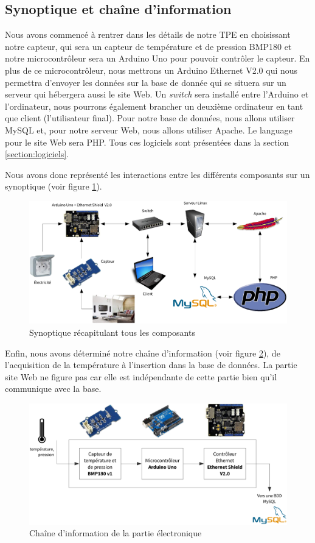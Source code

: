 \subsection{Synoptique et chaîne d'information}

Nous avons commencé à rentrer dans les détails de notre TPE en choisissant notre capteur, qui sera un capteur de température et de pression BMP180 et notre microcontrôleur sera un Arduino Uno pour pouvoir contrôler le capteur. En plus de ce microcontrôleur, nous mettrons un Arduino Ethernet V2.0 qui nous permettra d'envoyer les données sur la base de donnée qui se situera sur un serveur qui hébergera aussi le site Web. Un \emph{switch} sera installé entre l'Arduino et l'ordinateur, nous pourrons également brancher un deuxième ordinateur en tant que client (l'utilisateur final). Pour notre base de données, nous allons utiliser MySQL et, pour notre serveur Web, nous allons utiliser Apache. Le language pour le site Web sera PHP. Tous ces logiciels sont présentées dans la section \ref{section:logiciels}.

Nous avons donc représenté les interactions entre les différents composants sur un synoptique (voir figure \ref{figure:synoptique}).

\begin{figure}[!h]
	\centering
	\includegraphics[width=.9\linewidth]{Images/Synoptique}
	\caption{Synoptique récapitulant tous les composants}
	\label{figure:synoptique}
\end{figure}

Enfin, nous avons déterminé notre chaîne d'information (voir figure \ref{figure:ci}), de l'acquisition de la température à l'insertion dans la base de données. La partie site Web ne figure pas car elle est indépendante de cette partie bien qu'il communique avec la base.

\begin{figure}[!h]
	\centering
	\includegraphics[width=.9\linewidth]{Images/Chaine_information}
	\caption{Chaîne d'information de la partie électronique}
	\label{figure:ci}
\end{figure}
